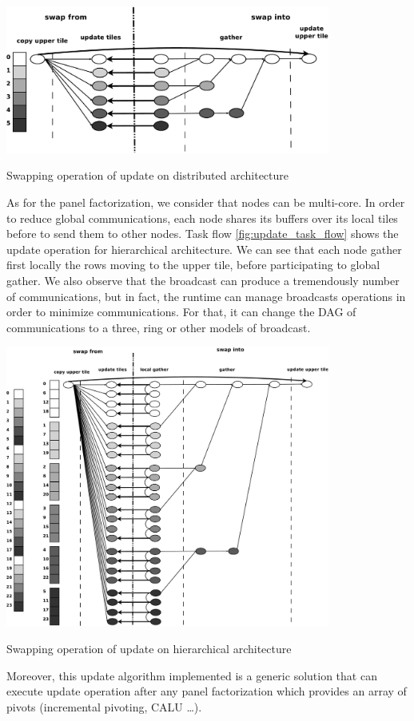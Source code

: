 \begin{taskflow}[!ht]
\centering
\includegraphics[width=0.8\textwidth]{figures/distributed_update_tf_bw.pdf}
\caption{Swapping operation of update on distributed architecture \label{fig:distributed_update_task_flow}}
\end{taskflow}

As for the panel factorization, we consider that nodes can be multi-core. In order to reduce global communications, each node shares its buffers over its local tiles before to send them to other nodes. Task flow \ref{fig:update_task_flow} shows the update operation for hierarchical architecture. We can see that each node gather first locally the rows moving to the upper tile, before participating to global gather. We also observe that the broadcast can produce a tremendously number of communications, but in fact, the runtime can manage broadcasts operations in order to minimize communications. For that, it can change the DAG of communications to a three, ring or other models of broadcast.

\begin{taskflow}[!ht]
\centering
\includegraphics[width=0.8\textwidth]{figures/update_tf_bw.pdf}
\caption{Swapping operation of update on hierarchical architecture \label{fig:update_task_flow}}
\end{taskflow}

Moreover, this update algorithm implemented is a generic solution that can execute update operation after any panel factorization which provides an array of pivots (incremental pivoting, CALU \dots).
